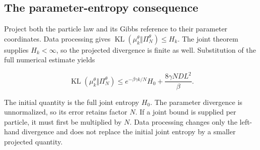 \documentclass[11pt,a4paper]{report}
\begin{document}
\subsection{\texorpdfstring{The parameter-entropy consequence}{The parameter-entropy consequence}}
\label{report-step-IPLA-LSI-UnconditionalTheorem-lean-4}


Project both the particle law and its Gibbs reference to their parameter coordinates. Data processing gives \(\operatorname{KL}(\mu_k^\theta\Vert\Pi_N^\theta)\le H_k\). The joint theorem supplies \(H_k<\infty\), so the projected divergence is finite as well. Substitution of the full numerical estimate yields

\[\operatorname{KL}(\mu_k^\theta\Vert\Pi_N^\theta)\le e^{-\beta\gamma k/N}H_0+\frac{8\gamma ND L^2}{\beta}.\]

The initial quantity is the full joint entropy \(H_0\). The parameter divergence is unnormalized, so its error retains factor \(N\). If a joint bound is supplied per particle, it must first be multiplied by \(N\). Data processing changes only the left-hand divergence and does not replace the initial joint entropy by a smaller projected quantity.
\end{document}
